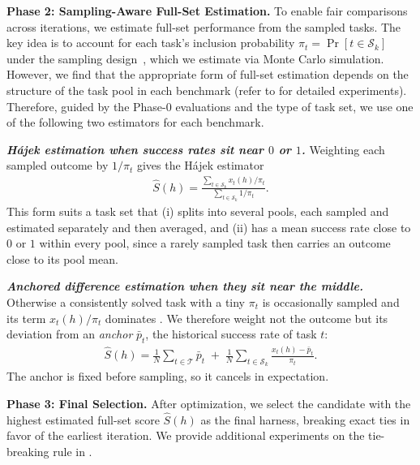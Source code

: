 \documentclass{article} %
\begin{document}
\textbf{Phase 2: Sampling-Aware Full-Set Estimation.}
To enable fair comparisons across iterations, we estimate full-set performance from the sampled tasks. The key idea is to account for each task's inclusion probability $\pi_t = \Pr[t \in \mathcal{S}_k]$ under the sampling design~\citep{Horvitz01121952}, which we estimate via Monte Carlo simulation. However, we find that the appropriate form of full-set estimation depends on the structure of the task pool in each benchmark (refer to  for detailed experiments). Therefore, guided by the Phase-0 evaluations and the type of task set, we use one of the following two estimators for each benchmark.

\textbf{\textit{H\'ajek estimation when success rates sit near $0$ or $1$.}}
Weighting each sampled outcome by $1/\pi_t$ gives the H\'ajek estimator~\citep{hajek1964asymptotic}
\begin{equation}
\begin{aligned}
\hat{S}(h) = \frac{\sum_{t \in \mathcal{S}_k} x_t(h) / \pi_t}{\sum_{t \in \mathcal{S}_k} 1 / \pi_t}.
\end{aligned}
\label{eq:full_estimate}
\end{equation}
This form suits a task set that (i) splits into several pools, each sampled and estimated separately and then averaged, and (ii) has a mean success rate close to $0$ or $1$ within every pool, since a rarely sampled task then carries an outcome close to its pool mean.

\textbf{\textit{Anchored difference estimation when they sit near the middle.}}
Otherwise a consistently solved task with a tiny $\pi_t$ is occasionally sampled and its term $x_t(h)/\pi_t$ dominates . We therefore weight not the outcome but its deviation from an \emph{anchor} $\bar{p}_t$, the historical success rate of task $t$:
\begin{equation}
\begin{aligned}
\hat{S}(h) = \frac{1}{N}\sum_{t \in \mathcal{T}} \bar{p}_t \;+\; \frac{1}{N}\sum_{t \in \mathcal{S}_k} \frac{x_t(h) - \bar{p}_t}{\pi_t}.
\end{aligned}
\label{eq:difference}
\end{equation}
The anchor is fixed before sampling, so it cancels in expectation.




\textbf{Phase 3: Final Selection.}
After optimization, we select the candidate with the highest estimated full-set score $\hat{S}(h)$ as the final harness, breaking exact ties in favor of the earliest iteration.
We provide additional experiments on the tie-breaking rule in .
\end{document}
